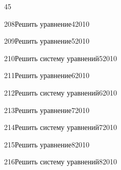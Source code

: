 \begin{TrigSourcePage}{45}
\begin{TrigExercise}{208}{Решить уравнение}{4}{2010}
\end{TrigExercise}
\begin{TrigExercise}{209}{Решить уравнение}{5}{2010}
\end{TrigExercise}
\begin{TrigExercise}{210}{Решить систему уравнений}{5}{2010}
\end{TrigExercise}
\begin{TrigExercise}{211}{Решить уравнение}{6}{2010}
\end{TrigExercise}
\begin{TrigExercise}{212}{Решить систему уравнений}{6}{2010}
\end{TrigExercise}
\begin{TrigExercise}{213}{Решить уравнение}{7}{2010}
\end{TrigExercise}
\begin{TrigExercise}{214}{Решить систему уравнений}{7}{2010}
\end{TrigExercise}
\begin{TrigExercise}{215}{Решить уравнение}{8}{2010}
\end{TrigExercise}
\begin{TrigExercise}{216}{Решить систему уравнений}{8}{2010}

\end{TrigExercise}
\end{TrigSourcePage}
